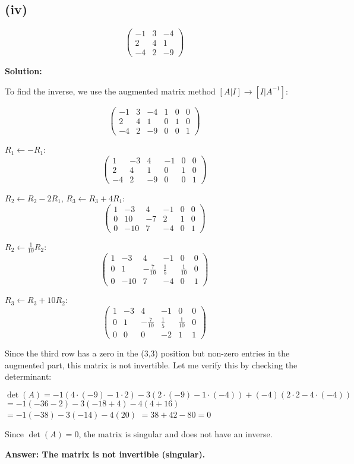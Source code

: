 \subsection*{(iv)}
\[
	\begin{pmatrix}
		-1 & 3 & -4 \\
		2  & 4 & 1  \\
		-4 & 2 & -9
	\end{pmatrix}
\]

\textbf{Solution:}

To find the inverse, we use the augmented matrix method $[A|I] \rightarrow [I|A^{-1}]$:

\[
	\left(\begin{array}{ccc|ccc}
			-1 & 3 & -4 & 1 & 0 & 0 \\
			2  & 4 & 1  & 0 & 1 & 0 \\
			-4 & 2 & -9 & 0 & 0 & 1
		\end{array}\right)
\]

$R_1 \leftarrow -R_1$:
\[
	\left(\begin{array}{ccc|ccc}
			1  & -3 & 4  & -1 & 0 & 0 \\
			2  & 4  & 1  & 0  & 1 & 0 \\
			-4 & 2  & -9 & 0  & 0 & 1
		\end{array}\right)
\]

$R_2 \leftarrow R_2 - 2R_1$, $R_3 \leftarrow R_3 + 4R_1$:
\[
	\left(\begin{array}{ccc|ccc}
			1 & -3  & 4  & -1 & 0 & 0 \\
			0 & 10  & -7 & 2  & 1 & 0 \\
			0 & -10 & 7  & -4 & 0 & 1
		\end{array}\right)
\]

$R_2 \leftarrow \frac{1}{10}R_2$:
\[
	\left(\begin{array}{ccc|ccc}
			1 & -3  & 4             & -1          & 0            & 0 \\
			0 & 1   & -\frac{7}{10} & \frac{1}{5} & \frac{1}{10} & 0 \\
			0 & -10 & 7             & -4          & 0            & 1
		\end{array}\right)
\]

$R_3 \leftarrow R_3 + 10R_2$:
\[
	\left(\begin{array}{ccc|ccc}
			1 & -3 & 4             & -1          & 0            & 0 \\
			0 & 1  & -\frac{7}{10} & \frac{1}{5} & \frac{1}{10} & 0 \\
			0 & 0  & 0             & -2          & 1            & 1
		\end{array}\right)
\]

Since the third row has a zero in the (3,3) position but non-zero entries in the augmented part, this matrix is not invertible. Let me verify this by checking the determinant:

$\det(A) = -1(4 \cdot (-9) - 1 \cdot 2) - 3(2 \cdot (-9) - 1 \cdot (-4)) + (-4)(2 \cdot 2 - 4 \cdot (-4))$
$= -1(-36 - 2) - 3(-18 + 4) - 4(4 + 16)$
$= -1(-38) - 3(-14) - 4(20)$
$= 38 + 42 - 80 = 0$

Since $\det(A) = 0$, the matrix is singular and does not have an inverse.

\textbf{Answer: The matrix is not invertible (singular).}